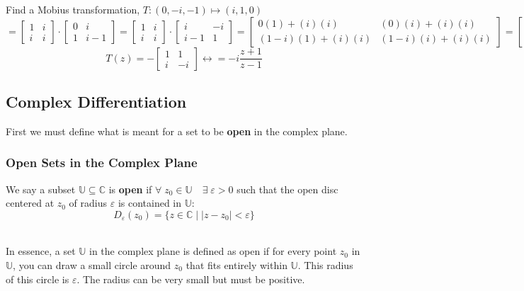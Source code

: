 \documentclass[a4paper, 10pt]{article}
\begin{document}
\begin{examplebox}{Find a Mobius transformation, $T:  (0,-i,-1) \mapsto (i, 1, 0)$}{}
  \scriptsize$$
    = \begin{bmatrix}1 & i \\ i & i\end{bmatrix} \cdot \begin{bmatrix}0 & i \\ 1 & i-1\end{bmatrix}
    = \begin{bmatrix}1 & i \\ i & i\end{bmatrix} \cdot \begin{bmatrix}i & -i \\ i-1 & 1\end{bmatrix}
    = \begin{bmatrix} 0(1) + (i)(i) & (0)(i) + (i)(i) \\ (1-i)(1)+ (i)(i) & (1-i)(i) + (i)(i)\end{bmatrix}
    = \begin{bmatrix} i^2 & i^2 \\ -i & i\end{bmatrix}
  $$
  \normalsize$$T(z)  = -\begin{bmatrix}1 & 1 \\ i & -i \end{bmatrix}\longleftrightarrow = -i \frac{z+1}{z-1}$$

\end{examplebox}

\pagebreak

\subsection{Complex Differentiation}
First we must define what is meant for a set to be \textbf{open} in the complex plane.
\subsubsection{Open Sets in the Complex Plane}
\begin{definitionbox}{}{}
  We say a subset $\mathbb{U} \subseteq \mathbb{C}$ is \textbf{open} if $\forall\;  z_0 \in \mathbb{U} \quad \exists \; \varepsilon   > 0$
  such that the open disc centered at $z_0$ of radius $\varepsilon$ is contained in $\mathbb{U}$:
  $$D_{\varepsilon} (z_0) = \{z \in \mathbb{C} \mid |z-z_0| < \varepsilon\}$$ \\
  \centering
\end{definitionbox}
\noindent In essence, a set $\mathbb{U}$ in the complex plane is defined as open if for every point $z_0$ in $\mathbb{U}$,
you can draw a small circle around $z_0$ that fits entirely within $\mathbb{U}$. This radius of this circle is $\varepsilon$. The
radius can be very small but must be positive.
\end{document}
